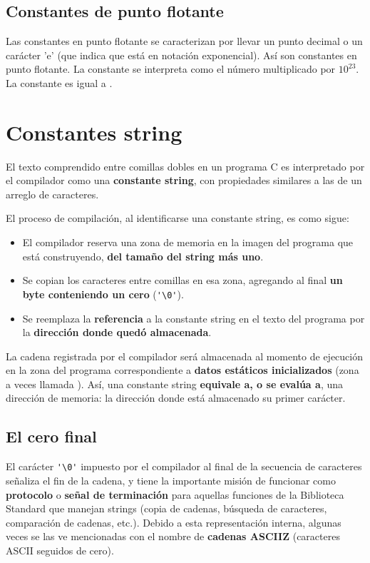 \subsection{Constantes de punto flotante}
Las constantes en punto flotante se caracterizan por llevar un punto decimal o un carácter 'e' (que
indica que está en notación exponencial). Así  son constantes en
punto flotante. La constante  se interpreta como el número  multiplicado por $10^{23}$. La
constante  es igual a .


\section{Constantes string}
\label{sec:constantesstring}
El texto comprendido entre comillas dobles en un programa C es interpretado por el compilador
como una \textbf{constante string}, con propiedades similares a las de un arreglo de caracteres. 

El proceso de compilación, al identificarse una constante string, es como sigue:
\begin{itemize}
	\item El compilador reserva una zona de memoria en la imagen del programa que está construyendo, \textbf{del
tamaño del string más uno}.
	\item Se copian los caracteres entre comillas en esa zona, agregando al final \textbf{un byte conteniendo un
cero} (\lstinline{'\0'}).
	\item Se reemplaza la \textbf{referencia} a la constante string en el texto del programa por la \textbf{dirección donde
quedó almacenada}.
\end{itemize}

La cadena registrada por el compilador será almacenada al momento de ejecución en la zona del
programa correspondiente a \textbf{datos estáticos inicializados} (zona a veces llamada ).
Así, una constante string \textbf{equivale a, o se evalúa a}, una dirección de memoria: la dirección donde está almacenado
su primer carácter. 

\subsection{El cero final}

El carácter \lstinline{'\0'} impuesto por el compilador al final de la secuencia de caracteres señaliza el fin de la cadena, y tiene la importante misión de funcionar como \textbf{protocolo} o \textbf{señal de terminación} para aquellas funciones de la Biblioteca Standard que manejan strings (copia de cadenas, búsqueda de caracteres, comparación de cadenas, etc.). Debido a esta representación interna, algunas veces se las ve mencionadas con el nombre de
\textbf{cadenas ASCIIZ} (caracteres ASCII seguidos de cero).

